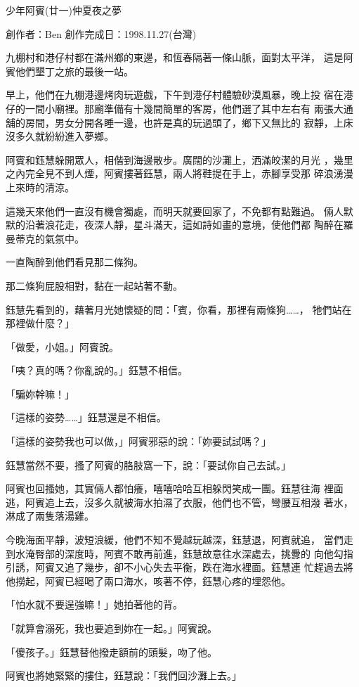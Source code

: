 



少年阿賓(廿一)仲夏夜之夢

創作者：Ben
創作完成日：1998.11.27(台灣)


九棚村和港仔村都在滿州鄉的東邊，和恆春隔著一條山脈，面對太平洋，
這是阿賓他們墾丁之旅的最後一站。

早上，他們在九棚港邊烤肉玩遊戲，下午到港仔村體驗砂漠風暴，晚上投
宿在港仔的一間小廟裡。那廟準備有十幾間簡單的客房，他們選了其中左右有
兩張大通舖的房間，男女分開各睡一邊，也許是真的玩過頭了，鄉下又無比的
寂靜，上床沒多久就紛紛進入夢鄉。

阿賓和鈺慧躲開眾人，相偕到海邊散步。廣闊的沙灘上，洒滿皎潔的月光
，幾里之內完全見不到人煙，阿賓摟著鈺慧，兩人將鞋提在手上，赤腳享受那
碎浪湧漫上來時的清涼。

這幾天來他們一直沒有機會獨處，而明天就要回家了，不免都有點難過。
倆人默默的沿著浪花走，夜深人靜，星斗滿天，這如詩如畫的意境，使他們都
陶醉在羅曼蒂克的氣氛中。

一直陶醉到他們看見那二條狗。

那二條狗屁股相對，黏在一起站著不動。

鈺慧先看到的，藉著月光她懷疑的問：「賓，你看，那裡有兩條狗……，
牠們站在那裡做什麼？」

「做愛，小姐。」阿賓說。

「咦？真的嗎？你亂說的。」鈺慧不相信。

「騙妳幹嘛！」

「這樣的姿勢……」鈺慧還是不相信。

「這樣的姿勢我也可以做，」阿賓邪惡的說：「妳要試試嗎？」

鈺慧當然不要，搔了阿賓的胳肢窩一下，說：「要試你自己去試。」

阿賓也回搔她，其實倆人都怕癢，嘻嘻哈哈互相躲閃笑成一團。鈺慧往海
裡面逃，阿賓追上去，沒多久就被海水拍濕了衣服，他們也不管，彎腰互相潑
著水，淋成了兩隻落湯雞。

今晚海面平靜，波短浪緩，他們不知不覺越玩越深，鈺慧退，阿賓就追，
當們走到水淹臀部的深度時，阿賓不敢再前進，鈺慧故意往水深處去，挑釁的
向他勾指引誘，阿賓又追了幾步，卻不小心失去平衡，跌在海水裡面。鈺慧連
忙趕過去將他撈起，阿賓已經喝了兩口海水，咳著不停，鈺慧心疼的埋怨他。

「怕水就不要逞強嘛！」她拍著他的背。

「就算會溺死，我也要追到妳在一起。」阿賓說。

「傻孩子。」鈺慧替他撥走額前的頭髮，吻了他。

阿賓也將她緊緊的摟住，鈺慧說：「我們回沙灘上去。」

